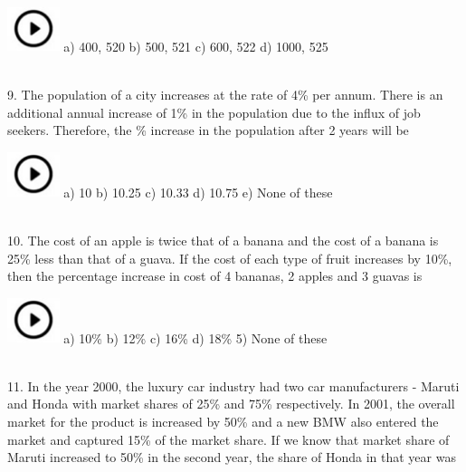 \documentclass{article}
\begin{document}
\noindent   \includegraphics*[width=0.60in, height=0.52in]{images/image1} a) 400, 520             b) 500, 521             c) 600, 522             d) 1000, 525

\noindent 

\noindent 
\\

9.   The population of a city increases at the rate of 4\% per annum. There is an additional annual increase of 1\% in the population due to the influx of job seekers. Therefore, the \% increase in the population after 2 years will be

\noindent 

\noindent   \includegraphics*[width=0.60in, height=0.52in]{images/image1} a) 10                        b) 10.25            c) 10.33             d) 10.75            e) None of these

\noindent  
\\

10. The cost of an apple is twice that of a banana and the cost of a banana is 25\% less than that of a guava. If the cost of each type of fruit increases by 10\%, then the percentage increase in cost of 4 bananas, 2 apples and 3 guavas is

\noindent 

\noindent    \includegraphics*[width=0.60in, height=0.52in]{images/image1} a) 10\%                    b) 12\%              c) 16\%              d) 18\%              5) None of these

\noindent 
\\

11. In the year 2000, the luxury car industry had two car manufacturers - Maruti and Honda with market shares of 25\% and 75\% respectively. In 2001, the overall market for the product is increased by 50\% and a new BMW also entered the market and captured 15\% of the market share. If we know that market share of Maruti increased to 50\% in the second year, the share of Honda in that year was
\end{document}
